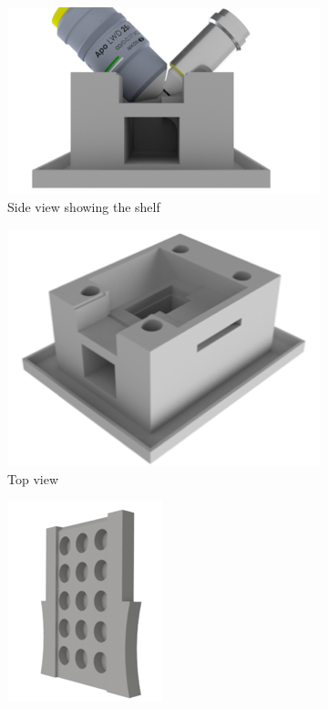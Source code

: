 \begin{figure}
    \centering
    \begin{subfigure}[b]{\linewidth}
         \centering
        \includegraphics{./chamber_side}
         \caption{Side view showing the shelf}
         \label{fig:chamber_side}
    \end{subfigure}
    \begin{subfigure}[b]{0.4\linewidth}
             \centering
        \includegraphics{./chamber_top}
         \caption{Top view}
         \label{fig:chamber_top}
    \end{subfigure}
    \begin{subfigure}[b]{0.4\linewidth}
             \centering
        \includegraphics{./chamber_slide}

\end{subfigure}
\end{figure}
